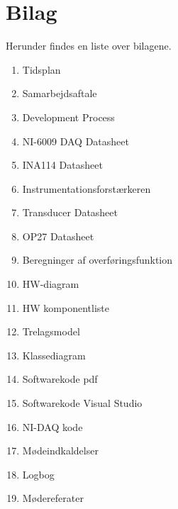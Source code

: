 \chapter{Bilag}
Herunder findes en liste over bilagene.
\begin{enumerate}
	\item Tidsplan
	\item Samarbejdsaftale
	\item Development Process
	\item NI-6009 DAQ Datasheet
	\item INA114 Datasheet
	\item Instrumentationsforstærkeren
	\item Transducer Datasheet
	\item OP27 Datasheet
	\item Beregninger af overføringsfunktion 
	\item HW-diagram
	\item HW komponentliste
	\item Trelagsmodel
	\item Klassediagram
	\item Softwarekode pdf
	\item Softwarekode Visual Studio
	\item NI-DAQ kode
	\item Mødeindkaldelser
	\item Logbog
	\item Mødereferater

\end{enumerate} 